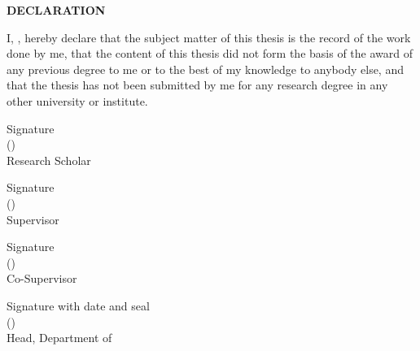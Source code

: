 \begin{titlepage}
    \begin{center}
        {\bf \large DECLARATION}
    \end{center}
    
    \par
    I, \authorname, hereby declare that the subject matter of this thesis is the record of the work done by me, that the content of this thesis did not form the basis of the award of any previous degree to me or to the best of my knowledge to anybody else, and that the thesis has not been submitted by me for any research degree in any other university or institute.
    
    \vspace*{18mm}
    \begin{flushleft}
        Signature\\
        (\authorname)\\
        Research Scholar
    \end{flushleft}
    
    \vspace*{18mm}
    \begin{flushleft}
        Signature\\
        (\supervisor)\\
        Supervisor
    \end{flushleft}
    
    \vspace*{18mm}
    \begin{flushleft}
        Signature\\
        (\cosupervisor)\\
        Co-Supervisor
    \end{flushleft}
    
    \vspace*{18mm}
    \begin{flushleft}
        Signature with date and seal\\
        (\headofdepartment)\\
        Head, Department of \department
    \end{flushleft}
\end{titlepage}